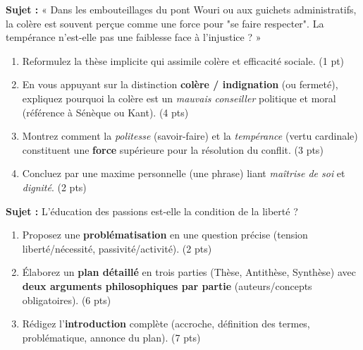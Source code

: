 \documentclass[11pt]{article}
\begin{document}
\begin{exercice}
\textbf{Sujet :} « Dans les embouteillages du pont Wouri ou aux guichets administratifs, la colère est souvent perçue comme une force pour "se faire respecter". La tempérance n'est-elle pas une faiblesse face à l'injustice ? »
\begin{enumerate}
    \item Reformulez la thèse implicite qui assimile colère et efficacité sociale. (1 pt)
    \item En vous appuyant sur la distinction \textbf{colère / indignation} (ou fermeté), expliquez pourquoi la colère est un \textit{mauvais conseiller} politique et moral (référence à Sénèque ou Kant). (4 pts)
    \item Montrez comment la \textit{politesse} (savoir-faire) et la \textit{tempérance} (vertu cardinale) constituent une \textbf{force} supérieure pour la résolution du conflit. (3 pts)
    \item Concluez par une maxime personnelle (une phrase) liant \textit{maîtrise de soi} et \textit{dignité}. (2 pts)
\end{enumerate}
\end{exercice}

\begin{exercice}
\textbf{Sujet :} \og L'éducation des passions est-elle la condition de la liberté ? \fg
\begin{enumerate}
    \item Proposez une \textbf{problématisation} en une question précise (tension liberté/nécessité, passivité/activité). (2 pts)
    \item Élaborez un \textbf{plan détaillé} en trois parties (Thèse, Antithèse, Synthèse) avec \textbf{deux arguments philosophiques par partie} (auteurs/concepts obligatoires). (6 pts)
    \item Rédigez l'\textbf{introduction} complète (accroche, définition des termes, problématique, annonce du plan). (7 pts)
\end{enumerate}
\end{exercice}
\end{document}
